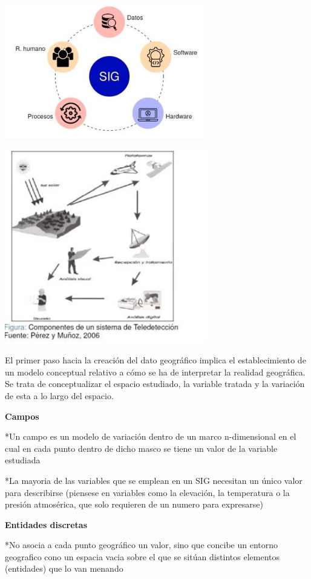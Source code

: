 \documentclass[
]{article}
\begin{document}
\includegraphics[width=\textwidth,height=2.29167in]{1.jpg}

\includegraphics[width=\textwidth,height=3.33333in]{2.jpg}

El primer paso hacia la creación del dato geográfico implica el
establecimiento de un modelo conceptual relativo a cómo se ha de
interpretar la realidad geográfica. Se trata de conceptualizar el
espacio estudiado, la variable tratada y la variación de esta a lo largo
del espacio.

\textbf{Campos}

*Un campo es un modelo de variación dentro de un marco n-dimensional en
el cual en cada punto dentro de dicho masco se tiene un valor de la
variable estudiada

*La mayoria de las variables que se emplean en un SIG necesitan un único
valor para describirse (piensese en variables como la elevación, la
temperatura o la presión atmosérica, que solo requieren de un numero
para expresarse)

\textbf{Entidades discretas}

*No asocia a cada punto geográfico un valor, sino que concibe un entorno
geografico cono un espacia vacia sobre el que se sitúan distintos
elementos (entidades) que lo van menando
\end{document}
